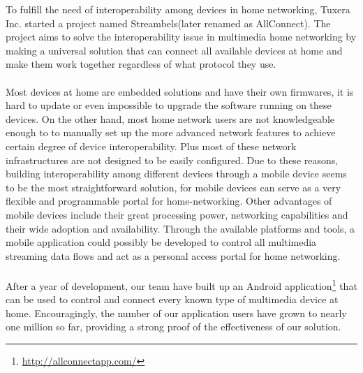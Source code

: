 
To fulfill the need of interoperability among devices in home networking,
Tuxera Inc. started a project named Streambels(later renamed as AllConnect). The
project aims to solve the interoperability issue in multimedia home networking
by making a universal solution that can connect all available devices at home
and make them work together regardless of what protocol they use.\\
\\
Most devices at home are embedded solutions and have their own firmwares, it is
hard to update or even impossible to upgrade the software running on these
devices. On the other hand, most home network users
 are not knowledgeable enough to 
to manually set up the more advanced
 network features to achieve certain degree of device interoperability. Plus
 most of these network infrastructures are not designed to be easily
 configured. Due to these reasons, building interoperability among different 
 devices through a mobile device seems to be the most straightforward solution,
 for mobile devices can serve as a very flexible and programmable portal for
 home-networking.  Other advantages of mobile devices include their great
 processing power, networking capabilities and their wide adoption and
 availability. Through the available platforms and tools, a mobile application
 could possibly be developed to control all multimedia streaming data flows and
 act as a personal access portal for home networking.\\
\\
After a year of development, our team have built up an Android
application\footnote{\url{http://allconnectapp.com/}} that can be used to
control and connect every known type of multimedia device at home.
Encouragingly, the number of our application users have grown to nearly one
million so far, providing a strong proof of the effectiveness of our solution.

